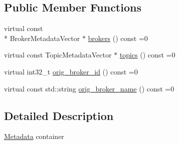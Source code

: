 \subsection*{Public Member Functions}
\begin{DoxyCompactItemize}
\item 
virtual const \\*
Broker\-Metadata\-Vector $\ast$ \hyperlink{classRdKafka_1_1Metadata_a5a22e460d2734348a0b392b8557087c1}{brokers} () const =0
\item 
virtual const Topic\-Metadata\-Vector $\ast$ \hyperlink{classRdKafka_1_1Metadata_a0c0e4915aa64843bcb585d84090911a1}{topics} () const =0
\item 
virtual int32\-\_\-t \hyperlink{classRdKafka_1_1Metadata_a1c54bbc1d53845a168ba0373a2665b33}{orig\-\_\-broker\-\_\-id} () const =0
\item 
virtual const std\-::string \hyperlink{classRdKafka_1_1Metadata_a88b43b6f9282dabef7de5af8004a5931}{orig\-\_\-broker\-\_\-name} () const =0
\end{DoxyCompactItemize}


\subsection{Detailed Description}
\hyperlink{classRdKafka_1_1Metadata}{Metadata} container 

